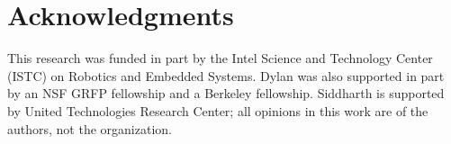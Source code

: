 \section*{Acknowledgments}
This research was funded in part by the Intel Science and Technology
Center (ISTC) on Robotics and Embedded Systems. Dylan was also
supported in part by an NSF GRFP fellowship and a Berkeley fellowship.
Siddharth is supported by United Technologies Research Center; all opinions
in this work are of the authors, not the organization.
